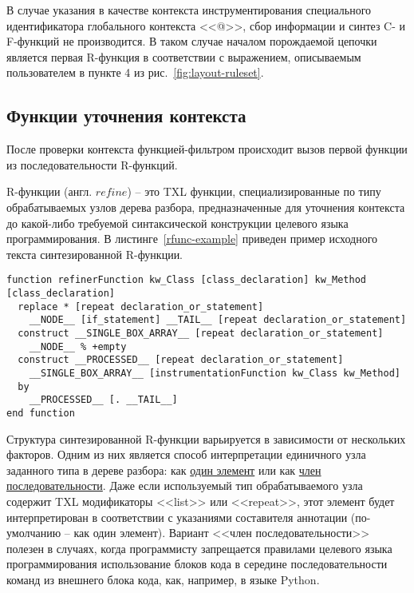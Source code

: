 В случае указания в качестве контекста инструментирования специального идентификатора глобального контекста <<@>>, сбор информации и синтез C- и F-функций не производится.
В таком случае началом порождаемой цепочки является первая R-функция в соответствии с выражением, описываемым пользователем в пункте 4 из рис.~\ref{fig:layout-ruleset}.

\subsection{Функции уточнения контекста}

После проверки контекста функцией-фильтром происходит вызов первой функции из последовательности R-функций.

R-функции (англ. $refine$) -- это TXL функции, специализированные по типу обрабатываемых узлов дерева разбора, предназначенные для уточнения контекста до какой-либо требуемой синтаксической конструкции целевого языка программирования.
В листинге~\ref{rfunc-example} приведен пример исходного текста синтезированной R-функции.

\begin{lstlisting}[frame=single, language=TXL, label={rfunc-example}, caption={Пример синтезированной R-функции.}]
function refinerFunction kw_Class [class_declaration] kw_Method [class_declaration]
  replace * [repeat declaration_or_statement]
    __NODE__ [if_statement] __TAIL__ [repeat declaration_or_statement]
  construct __SINGLE_BOX_ARRAY__ [repeat declaration_or_statement]
    __NODE__ % +empty
  construct __PROCESSED__ [repeat declaration_or_statement]
    __SINGLE_BOX_ARRAY__ [instrumentationFunction kw_Class kw_Method]
  by
    __PROCESSED__ [. __TAIL__]
end function
\end{lstlisting}

Структура синтезированной R-функции варьируется в зависимости от нескольких факторов.
Одним из них является способ интерпретации единичного узла заданного типа в дереве разбора: как \underline{один элемент} или как \underline{член последовательности}.
Даже если используемый тип обрабатываемого узла содержит TXL модификаторы <<list>> или <<repeat>>, этот элемент будет интерпретирован в соответствии с указаниями составителя аннотации (по-умолчанию -- как один элемент).
Вариант <<член последовательности>> полезен в случаях, когда программисту запрещается правилами целевого языка программирования использование блоков кода в середине последовательности команд из внешнего блока кода, как, например, в языке Python.

